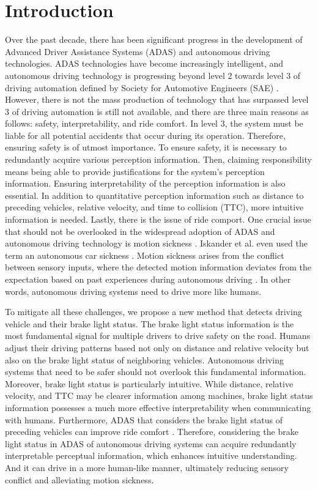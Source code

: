 \section{Introduction}
Over the past decade, there has been significant progress in the development of Advanced Driver Assistance Systems (ADAS) and autonomous driving technologies. ADAS technologies have become increasingly intelligent, and autonomous driving technology is progressing beyond level 2 towards level 3 of driving automation defined by Society for Automotive Engineers (SAE) \cite{sae20213016}. 
However, there is not the mass production of technology that has surpassed level 3 of driving automation is still not available, and there are three main reasons as follows: safety, interpretability, and ride comfort.
In level 3, the system must be liable for all potential accidents that occur during its operation. 
Therefore, ensuring safety is of utmost importance. To ensure safety, it is necessary to redundantly acquire various perception information.
Then, claiming responsibility means being able to provide justifications for the system's perception information.
Ensuring interpretability of the perception information is also essential.
In addition to quantitative perception information such as distance to preceding vehicles, relative velocity, and time to collision (TTC), more intuitive information is needed.
Lastly, there is the issue of ride comport. 
One crucial issue that should not be overlooked in the widespread adoption of ADAS and autonomous driving technology is motion sickness \cite{diels2016self, iskander2019car}.
Iskander et al. even used the term an autonomous car sickness \cite{iskander2019car}.
Motion sickness arises from the conflict between sensory inputs, where the detected motion information deviates from the expectation based on past experiences during autonomous driving \cite{reason1975motion,reason1978motion}.
In other words, autonomous driving systems need to drive more like humans.

To mitigate all these challenges, we propose a new method that detects driving vehicle and their brake light status.
The brake light status information is the most fundamental signal for multiple drivers to drive safety on the road.
Humans adjust their driving patterns based not only on distance and relative velocity but also on the brake light status of neighboring vehicles. 
Autonomous driving systems that need to be safer should not overlook this fundamental information.
Moreover, brake light status is particularly intuitive.
While distance, relative velocity, and TTC may be clearer information among machines, brake light status information possesses a much more effective interpretability when communicating with humans.
Furthermore, ADAS that considers the brake light status of preceding vehicles can improve ride comfort \cite{pirhonen2022predictive}.
Therefore, considering the brake light status in ADAS of autonomous driving systems can acquire redundantly interpretable perceptual information, which enhances intuitive understanding.
And it can drive in a more human-like manner, ultimately reducing sensory conflict and alleviating motion sickness.


